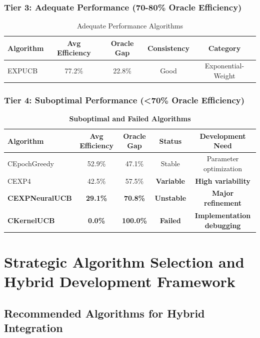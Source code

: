 \documentclass[12pt,a4paper]{article}
\newcommand{\critical}[1]{\textcolor{criticalcolor}{\textbf{#1}}}
\begin{document}
\subsubsection{Tier 3: Adequate Performance (70-80\% Oracle Efficiency)}

\begin{table}[H]
\centering
\caption{Adequate Performance Algorithms}
\begin{tabular}{|l|c|c|c|c|}
\hline
\textbf{Algorithm} & \textbf{Avg Efficiency} & \textbf{Oracle Gap} & \textbf{Consistency} & \textbf{Category} \\
\hline
\hline
EXPUCB & 77.2\% & 22.8\% & Good & Exponential-Weight \\
\hline
\end{tabular}
\end{table}

\subsubsection{Tier 4: Suboptimal Performance (<70\% Oracle Efficiency)}

\begin{table}[H]
\centering
\caption{\critical{Suboptimal and Failed Algorithms}}
\begin{tabular}{|l|c|c|c|c|}
\hline
\textbf{Algorithm} & \textbf{Avg Efficiency} & \textbf{Oracle Gap} & \textbf{Status} & \textbf{Development Need} \\
\hline
\hline
CEpochGreedy & 52.9\% & 47.1\% & Stable & Parameter optimization \\
CEXP4 & 42.5\% & 57.5\% & \critical{Variable} & \critical{High variability} \\
\critical{CEXPNeuralUCB} & \critical{29.1\%} & \critical{70.8\%} & \critical{Unstable} & \critical{Major refinement} \\
\critical{CKernelUCB} & \critical{0.0\%} & \critical{100.0\%} & \critical{Failed} & \critical{Implementation debugging} \\
\hline
\end{tabular}
\end{table}

\section{Strategic Algorithm Selection and Hybrid Development Framework}

\subsection{Recommended Algorithms for Hybrid Integration}
\end{document}
